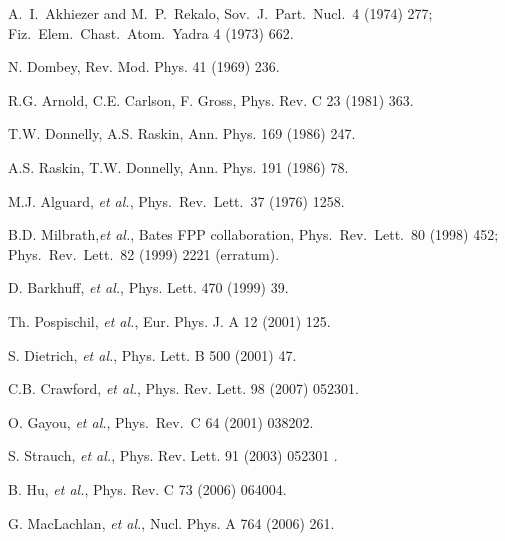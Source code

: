 \begin{thebibliography}{PPV06}
  A.~I.~Akhiezer and M.~P.~Rekalo,
  Sov.\ J.\ Part.\ Nucl.\   4 (1974) 277;
  Fiz.\ Elem.\ Chast.\ Atom.\ Yadra  4 (1973) 662.

N. Dombey, Rev. Mod. Phys. 41 (1969) 236.

R.G. Arnold, C.E. Carlson, F. Gross, Phys. Rev. C  23 (1981) 363.

T.W. Donnelly, A.S. Raskin, Ann. Phys. 169 (1986) 247.

A.S. Raskin, T.W. Donnelly, Ann. Phys. 191 (1986) 78.

  M.J. Alguard, {\it et al.},
  Phys.\ Rev.\ Lett.\   37 (1976) 1258.

 B.D. Milbrath,{\it et al.}, Bates FPP collaboration,
  Phys.\ Rev.\ Lett.\   80 (1998) 452; Phys.\ Rev.\ Lett.\  82 (1999) 2221 (erratum).

D. Barkhuff, {\it et al.}, Phys. Lett. 470 (1999) 39. 

Th. Pospischil, {\it et al.}, Eur. Phys. J. A  12 (2001) 125.

S. Dietrich, {\it et al.}, Phys. Lett. B  500 (2001) 47.

C.B. Crawford, {\it et al.},
Phys. Rev. Lett.  98 (2007) 052301.

O. Gayou, {\it et al.},
Phys.\ Rev.\ C  64 (2001) 038202.

S. Strauch, {\it et al.}, Phys. Rev. Lett. 91 (2003) 052301 .

B. Hu, {\it et al.}, Phys. Rev. C 73 (2006) 064004. 

G. MacLachlan, {\it et al.}, Nucl. Phys. A  764 (2006) 261. 


\end{thebibliography}
